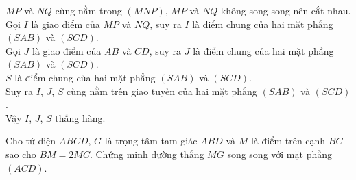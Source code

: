 \begin{bt}
\begin{bt}
{\begin{listEX}
		\item[c)]
	$MP$ và $NQ$ cùng nằm trong $\left(MNP\right)$, $MP$ và $NQ$ không song song nên cắt nhau.\\
	Gọi $I$ là giao điểm của $MP$ và $NQ$, suy ra $I$ là điểm chung của hai mặt phẳng $\left(SAB\right)$ và $\left(SCD\right)$.\\
	Gọi $J$ là giao điểm của $AB$ và $CD$, suy ra $J$ là điểm chung của hai mặt phẳng $\left(SAB\right)$ và $\left(SCD\right)$.\\
	$S$ là điểm chung của hai mặt phẳng $\left(SAB\right)$ và $\left(SCD\right)$.\\
	Suy ra $I$, $J$, $S$ cùng nằm trên giao tuyến của hai mặt phẳng $\left(SAB\right)$ và $\left(SCD\right)$.\\
	Vậy $I$, $J$, $S$ thẳng hàng.
\end{listEX}

}
\end{bt}

\begin{bt}%
	Cho tứ diện $ABCD$, $G$ là trọng tâm tam giác $ABD$ và $M$ là điểm trên cạnh $BC$ sao cho $BM=2MC$. Chứng minh đường thẳng $MG$ song song với mặt phẳng $(ACD)$.
\end{bt}


\end{bt}
